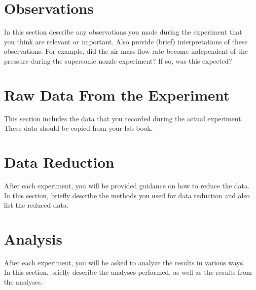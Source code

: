 \documentclass[12pt,letterpaper]{article}       %
\begin{document}
\section{Observations}

In this section describe any observations you made during the experiment that you think are relevant or important. Also provide (brief) interpretations of these observations. For example, did the air mass flow rate become independent of the pressure during the supersonic nozzle experiment? If so, was this expected?


\section{Raw Data From the Experiment}

This section includes the data that you recorded during the actual experiment. These data should be copied from your lab book.


\section{Data Reduction}

After each experiment, you will be provided guidance on how to reduce the data. In this section, briefly describe the methods you used for data reduction and also list the reduced data.


\section{Analysis}

After each experiment, you will be asked to analyze the results in various ways. In this section, briefly describe the analyses performed, as well as the results from the analyses.
\end{document}

